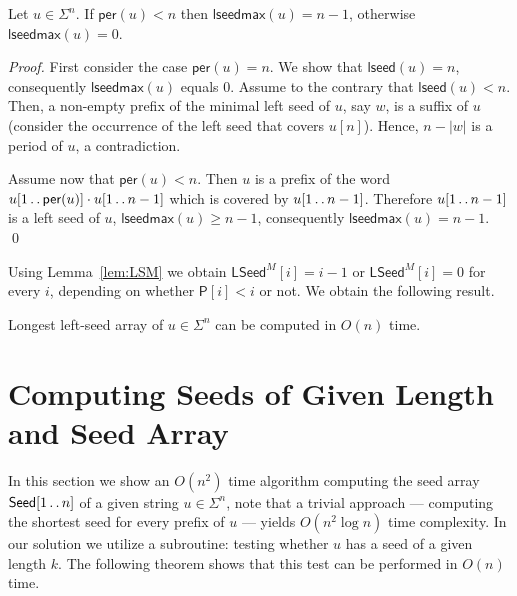 \documentclass{llncs}
\newcommand{\per}{\textsf{per}}
\newcommand{\lseed}{\textsf{lseed}}
\newcommand{\lseedmax}{\textsf{lseedmax}}
\newcommand{\LSeed}{\textsf{LSeed}}
\newcommand{\Seed}{\textsf{Seed}}
\newcommand{\Period}{\textsf{P}}
\def\dotdot{\mathinner{\ldotp\ldotp}}
\begin{document}
  \begin{lemma}\label{lem:LSM}
    Let $u \in \Sigma^n$.
    If $\per(u)<n$ then $\lseedmax(u)=n-1$, otherwise $\lseedmax(u)=0$.
  \end{lemma}

  \begin{proof}
    First consider the case $\per(u)=n$.
    We show that $\lseed(u)=n$, consequently $\lseedmax(u)$ equals $0$.
    Assume to the contrary that $\lseed(u)<n$.
    Then, a non-empty prefix of the minimal left seed of $u$, say
    $w$, is a suffix of $u$ (consider the occurrence of the left seed that covers $u[n]$).
    Hence, $n - |w|$ is a period of $u$, a contradiction.

    Assume now that $\per(u)<n$.
    Then $u$ is a prefix of the word $u[1 \dotdot \per(u)]\cdot u[1 \dotdot n-1]$
    which is covered by $u[1 \dotdot n-1]$.
    Therefore $u[1 \dotdot n-1]$ is a left seed of $u$, $\lseedmax(u) \ge n-1$,
    consequently $\lseedmax(u)=n-1$.
    \qed
  \end{proof}

  \noindent
  Using Lemma~\ref{lem:LSM} we obtain $\LSeed^M[i] = i-1$ or $\LSeed^M[i] = 0$ for every $i$,
  depending on whether $\Period[i]<i$ or not.
  We obtain the following result.

  \begin{theorem}
    Longest left-seed array of $u \in \Sigma^n$ can be computed in $O(n)$ time.
  \end{theorem}


  \section{Computing Seeds of Given Length and Seed Array} \label{sec:SeedArray}
  In this section we show an $O(n^2)$ time algorithm computing the seed array $\Seed[1 \dotdot n]$
  of a given string $u \in \Sigma^n$, note that a trivial approach --- computing
  the shortest seed for every prefix of $u$ --- yields $O(n^2\log{n})$ time complexity.
  In our solution we utilize a subroutine: testing whether $u$ has a seed of a given length $k$.
  The following theorem shows that this test can be performed in $O(n)$ time.
\end{document}

